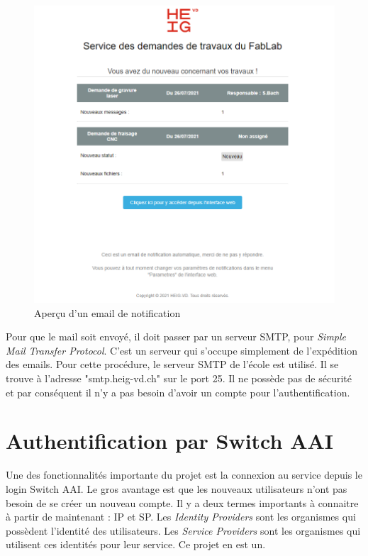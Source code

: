 \documentclass[
    iai, %
    eai, %
]{heig-tb}
\begin{document}
\begin{figure}[h]
  \includegraphics[width=14cm]{email.PNG}
  \caption{Aperçu d'un email de notification}
\end{figure}

Pour que le mail soit envoyé, il doit passer par un serveur SMTP, pour \emph{Simple Mail Transfer Protocol}. C'est un serveur qui s'occupe simplement de l'expédition des emails.
Pour cette procédure, le serveur SMTP de l'école est utilisé. Il se trouve à l'adresse "smtp.heig-vd.ch" sur le port 25. Il ne possède pas de sécurité et par conséquent il n'y a pas besoin d'avoir un compte pour l'authentification.

\newpage
\section{Authentification par Switch AAI}
Une des fonctionnalités importante du projet est la connexion au service depuis le login Switch AAI. Le gros avantage est que les nouveaux utilisateurs n'ont pas besoin de se créer un nouveau compte. Il y a deux termes importants à connaitre à partir de maintenant : IP et SP. Les \emph{Identity Providers} sont les organismes qui possèdent l'identité des utilisateurs. Les \emph{Service Providers} sont les organismes qui utilisent ces identités pour leur service. Ce projet en est un.
\end{document}
